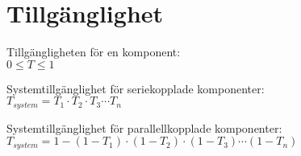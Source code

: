 \section*{Tillgänglighet}
			Tillgängligheten för en komponent: \\ 
      $ 0 \leqslant T \leqslant 1 $
			
			Systemtillgänglighet för seriekopplade komponenter:  \\ 
      $T_{system} = T_1 \cdot T_2 \cdot T_3 \cdots T_n$ 
			
			Systemtillgänglighet för parallellkopplade komponenter:  \\ 
      $ T_{system} = 1- \left(1 - T_1 \right) \cdot  \left(1 - T_2 \right) \cdot  \left(1 - T_3 \right) \cdots  \left(1 - T_n \right)$ 
